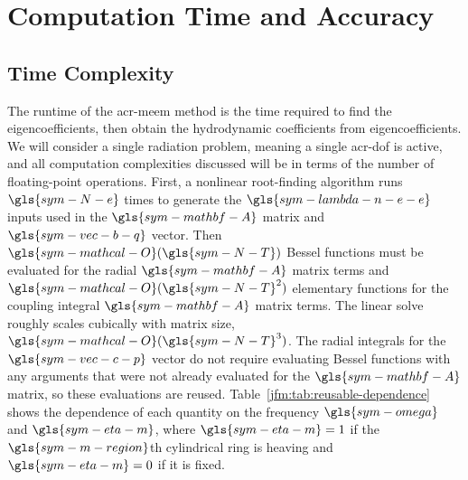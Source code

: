 \documentclass[lineno]{JFM-FLM_Au}
\begin{document}
\section{Computation Time and Accuracy}\label{jfm:sec:compute-time}
\subsection{Time Complexity}
The runtime of the \gls{acr-meem} method is the time required to find the eigencoefficients, then obtain the hydrodynamic coefficients from eigencoefficients.
We will consider a single radiation problem, meaning a single \gls{acr-dof} is active, and all computation complexities discussed will be in terms of the number of floating-point operations.
First, a nonlinear root-finding algorithm runs $\gls{sym-N-e}$ times to generate the $\gls{sym-lambda-n-e-e}$ inputs used in the $\gls{sym-mathbf-A}$ matrix and $\gls{sym-vec-b-q}$ vector.
Then $\gls{sym-mathcal-O}(\gls{sym-N-T})$ Bessel functions must be evaluated for the radial $\gls{sym-mathbf-A}$ matrix terms %
and $\gls{sym-mathcal-O}(\gls{sym-N-T}^2)$ elementary functions for the coupling integral $\gls{sym-mathbf-A}$ matrix terms.
The linear solve roughly scales cubically with matrix size, $\gls{sym-mathcal-O}(\gls{sym-N-T}^3)$.
The radial integrals for the $\gls{sym-vec-c-p}$ vector do not require evaluating Bessel functions with any arguments that were not already evaluated for the $\gls{sym-mathbf-A}$ matrix, so these evaluations are reused.
Table~\ref{jfm:tab:reusable-dependence} shows the dependence of each quantity on the frequency $\gls{sym-omega}$ and $\gls{sym-eta-m}$, where $\gls{sym-eta-m}=1$ if the $\gls{sym-m-region}$th cylindrical ring is heaving and $\gls{sym-eta-m}=0$ if it is fixed. 
\end{document}

